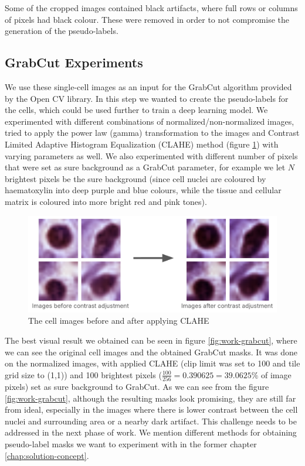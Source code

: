 Some of the cropped images contained black artifacts, where full rows or columns of pixels had black colour. These were removed in order to not compromise the generation of the pseudo-labels.

\subsection{GrabCut Experiments}
We use these single-cell images as an input for the GrabCut algorithm provided by the Open CV library. In this step we wanted to create the pseudo-labels for the cells, which could be used further to train a deep learning model. We experimented with different combinations of normalized/non-normalized images, tried to apply the power law (gamma) transformation to the images and Contrast Limited Adaptive Histogram Equalization (CLAHE) method (figure \ref{fig:work-clahe}) with varying parameters as well. We also experimented with different number of pixels that were set as sure background as a GrabCut parameter, for example we let $N$ brightest pixels be the sure background (since cell nuclei are coloured by haematoxylin into deep purple and blue colours, while the tissue and cellular matrix is coloured into more bright red and pink tones). 

\begin{figure}[H]
    \begin{centering}
    \includegraphics[width=14cm]{assets/images/work-cont-adj.png}
    \par\end{centering}
    \caption{The cell images before and after applying CLAHE}
    \label{fig:work-clahe}
\end{figure}

The best visual result we obtained can be seen in figure \ref{fig:work-grabcut}, where we can see the original cell images and the obtained GrabCut masks. It was done on the normalized images, with applied CLAHE (clip limit was set to 100 and tile grid size to (1,1)) and 100 brightest pixels ($\frac{100}{256} = 0.390625 = 39.0625\%$ of image pixels) set as sure background to GrabCut. As we can see from the figure \ref{fig:work-grabcut}, although the resulting masks look promising, they are still far from ideal, especially in the images where there is lower contrast between the cell nuclei and surrounding area or a nearby dark artifact. This challenge needs to be addressed in the next phase of work. We mention different methods for obtaining pseudo-label masks we want to experiment with in the former chapter \ref{chap:solution-concept}. 

